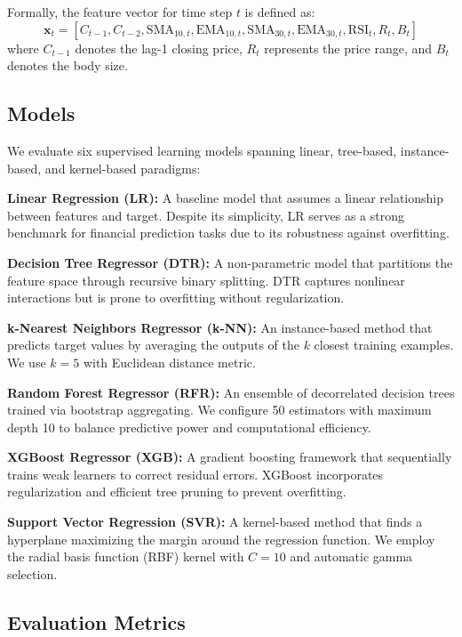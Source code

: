 \documentclass[conference]{IEEEtran}
\begin{document}
Formally, the feature vector for time step $t$ is defined as:
\begin{equation}
    \mathbf{x}_t = [C_{t-1}, C_{t-2}, \text{SMA}_{10,t}, \text{EMA}_{10,t}, \text{SMA}_{30,t}, \text{EMA}_{30,t}, \text{RSI}_t, R_t, B_t]
\end{equation}
where $C_{t-1}$ denotes the lag-1 closing price, $R_t$ represents the price range, and $B_t$ denotes the body size.

\subsection{Models}

We evaluate six supervised learning models spanning linear, tree-based, instance-based, and kernel-based paradigms:

\textbf{Linear Regression (LR):} A baseline model that assumes a linear relationship between features and target.
Despite its simplicity, LR serves as a strong benchmark for financial prediction tasks due to its robustness against overfitting.

\textbf{Decision Tree Regressor (DTR):} A non-parametric model that partitions the feature space through recursive binary splitting.
DTR captures nonlinear interactions but is prone to overfitting without regularization.

\textbf{k-Nearest Neighbors Regressor (k-NN):} An instance-based method that predicts target values by averaging the outputs of the $k$ closest training examples.
We use $k=5$ with Euclidean distance metric.

\textbf{Random Forest Regressor (RFR):} An ensemble of decorrelated decision trees trained via bootstrap aggregating.
We configure 50 estimators with maximum depth 10 to balance predictive power and computational efficiency.

\textbf{XGBoost Regressor (XGB):} A gradient boosting framework that sequentially trains weak learners to correct residual errors.
XGBoost incorporates regularization and efficient tree pruning to prevent overfitting.

\textbf{Support Vector Regression (SVR):} A kernel-based method that finds a hyperplane maximizing the margin around the regression function.
We employ the radial basis function (RBF) kernel with $C=10$ and automatic gamma selection.

\subsection{Evaluation Metrics}
\end{document}
